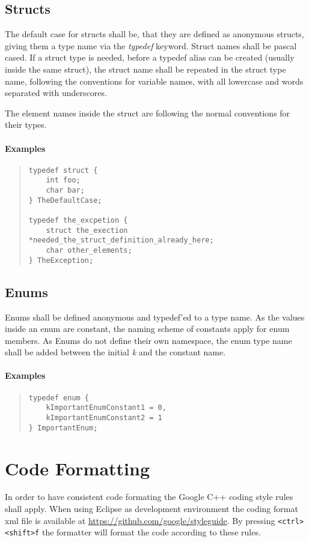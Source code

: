 \documentclass[final,a4paper,10pt, oneside]{article}
\begin{document}
\subsection{Structs}
The default case for structs shall be, that they are defined as anonymous structs, giving them a type name via the \emph{typedef} keyword.  Struct names shall be pascal cased. If a struct type is needed, before a typedef alias can be created (usually inside the same struct), the struct name shall be repeated in the struct type name, following the conventions for variable names, with all lowercase and words separated with underscores.

The element names inside the struct are following the normal conventions for their types.

\paragraph{Examples}
\begin{quote}
\begin{lstlisting}
typedef struct {
    int foo;
    char bar;
} TheDefaultCase;

typedef the_excpetion {
    struct the_exection *needed_the_struct_definition_already_here;
    char other_elements;
} TheException;
\end{lstlisting}
\end{quote}

\subsection{Enums}
Enums shall be defined anonymous and typedef'ed to a type name. As the values inside an enum are constant, the naming scheme of constants apply for enum members. As Enums do not define their own namespace, the enum type name shall be added between the initial \emph{k} and the constant name.

\paragraph{Examples}
\begin{quote}
\begin{lstlisting}
typedef enum {
    kImportantEnumConstant1 = 0,
    kImportantEnumConstant2 = 1
} ImportantEnum;
\end{lstlisting}
\end{quote}



\section{Code Formatting}
In order to have consistent code formating the Google C++ coding style rules shall apply. When using Eclipse as development environment the coding format xml file is available at \url{https://github.com/google/styleguide}. By pressing \verb|<ctrl><shift>f| the formatter will format the code according to these rules.
\end{document}
